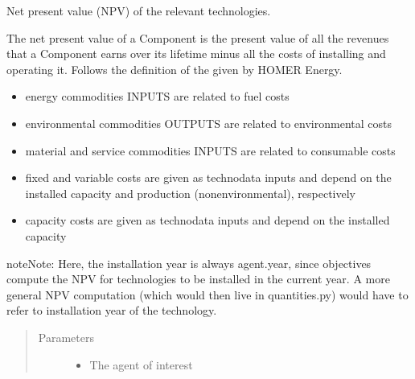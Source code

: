 \documentclass[letterpaper,10pt,english]{sphinxmanual}
\begin{document}
\begin{fulllineitems}
\label{\detokenize{api:muse.objectives.net_present_value}}
Net present value (NPV) of the relevant technologies.

The net present value of a Component is the present value  of all the revenues that
a Component earns over its lifetime minus all the costs of installing and operating
it. Follows the definition of the  given by HOMER Energy.
\begin{itemize}
\item {} 
energy commodities INPUTS are related to fuel costs

\item {} 
environmental commodities OUTPUTS are related to environmental costs

\item {} 
material and service commodities INPUTS are related to consumable costs

\item {} 
fixed and variable costs are given as technodata inputs and depend on the
installed capacity and production (non\sphinxhyphen{}environmental), respectively

\item {} 
capacity costs are given as technodata inputs and depend on the installed capacity

\end{itemize}

\begin{sphinxadmonition}{note}{Note:}
Here, the installation year is always agent.year, since objectives compute the
NPV for technologies to be installed in the current year. A more general NPV
computation (which would then live in quantities.py) would have to refer to
installation year of the technology.
\end{sphinxadmonition}
\begin{quote}\begin{description}
\item[{Parameters}] \leavevmode\begin{itemize}
\item {} 
 \textendash{} The agent of interest


\end{itemize}
\end{description}
\end{quote}
\end{fulllineitems}
\end{document}
